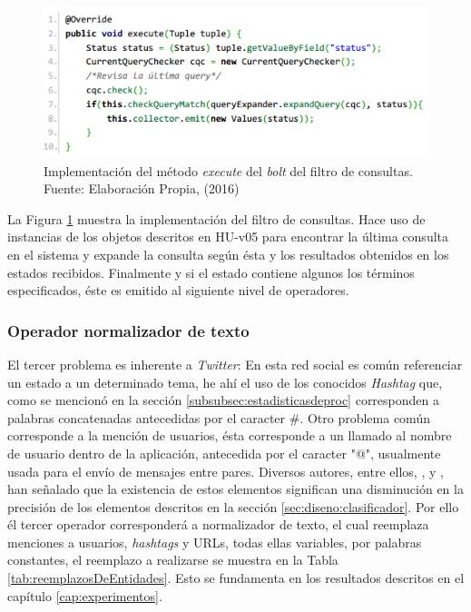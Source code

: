 \begin{figure}[H]
	\centering
	\captionsetup{justification=centering}
	\includegraphics[scale=0.8]{images/FilterBolt.png}
	\caption[Implementación del método \textit{execute} del \textit{bolt} del filtro de consultas.]{Implementación del método \textit{execute} del \textit{bolt} del filtro de consultas.\\Fuente: Elaboración Propia, (2016)}
	\label{fig:operadorFiltro}
\end{figure}

La Figura \ref{fig:operadorFiltro} muestra la implementación del filtro de consultas. Hace uso de instancias de los objetos descritos en HU-v05 para encontrar la última consulta en el sistema y expande la consulta según ésta y los resultados obtenidos en los estados recibidos. Finalmente y si el estado contiene algunos los términos especificados, éste es emitido al siguiente nivel de operadores.

\subsubsection*{Operador normalizador de texto}
\label{subsubsec:3op}

El tercer problema es inherente a \textit{Twitter}: En esta red social es común referenciar un estado a un determinado tema, he ahí el uso de los conocidos \textit{Hashtag} que, como se mencionó en la sección \ref{subsubsec:estadisticasdeproc} corresponden a palabras concatenadas antecedidas por el caracter \#. Otro problema común corresponde a la mención de usuarios, ésta corresponde a un llamado al nombre de usuario dentro de la aplicación, antecedida por el caracter "@", usualmente usada para el envío de mensajes entre pares. Diversos autores, entre ellos, \cite{NLPaccuracy}, \cite{NLPaccuracy1} y \cite{NLPaccuracy2}, han señalado que la existencia de estos elementos significan una disminución en la precisión de los elementos descritos en la sección \ref{sec:diseno:clasificador}. Por ello él tercer operador corresponderá a normalizador de texto, el cual reemplaza menciones a usuarios, \textit{hashtags} y URLs, todas ellas variables, por palabras constantes, el reemplazo a realizarse se muestra en la Tabla \ref{tab:reemplazosDeEntidades}. Esto se fundamenta en los resultados descritos en el capítulo \ref{cap:experimentos}.

